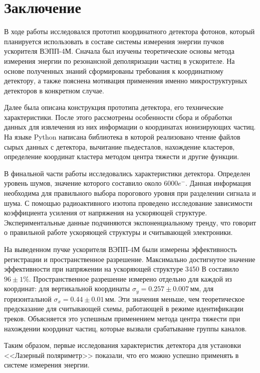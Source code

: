 \chapter*{Заключение}
В ходе работы исследовался прототип координатного детектора фотонов, который планируется использовать в составе системы измерения энергии пучков ускорителя ВЭПП-4М. Сначала был изучены теоретические основы метода измерения энергии по резонансной деполяризации частиц в ускорителе. На основе полученных знаний сформированы требования к координатному детектору, а также  пояснена мотивация применения именно микроструктурных детекторов в конкретном случае. 
\par Далее была описана конструкция прототипа детектора, его технические характеристики. После этого рассмотрены особенности сбора и обработки данных для извлечения из них информации о координатах ионизирующих частиц. На языке Python написана библиотека в которой реализовано чтение файлов сырых данных с детектора, вычитание пьедесталов, нахождение кластеров, определение координат кластера методом центра тяжести и другие функции. 
\par В финальной части работы исследовались характеристики детектора. Определен уровень шумов, значение которого составило около $6000 e^-$. Данная информация необходима для правильного выбора порогового уровня при разделении сигнала и шума. С помощью радиоактивного изотопа проведено исследование зависимости коэффициента усиления от напряжения на ускоряющей структуре. Экспериментальные данные подчиняются экспоненциальному тренду, что говорит о правильной работе ускоряющей структуры и считывающей электроники. 
\par На выведенном пучке ускорителя ВЭПП-4М были измерены эффективность регистрации и пространственное разрешение. Максимально достигнутое значение эффективности при напряжении на ускоряющей структуре 3450 В составило $96 \pm 1\%$. Пространственное разрешение измерено отдельно для каждой из координат: для вертикальной координаты $\sigma_y = 0.257\pm0.007$\,мм, для горизонтальной $\sigma_x = 0.44\pm0.01$\,мм. Эти значения меньше, чем теоретическое предсказание для считывающей схемы, работающей в режиме идентификации треков. Объясняется это успешным применением метода центра тяжести при нахождении координат частиц, которые вызвали срабатывание группы каналов. 
\par Таким образом, первые исследования характеристик детектора для установки <<Лазерный поляриметр>> показали, что его можно успешно применять в системе измерения энергии. 